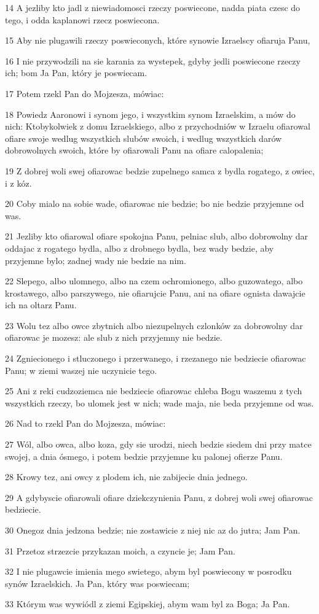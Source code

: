 \par 14 A jezliby kto jadl z niewiadomosci rzeczy poswiecone, nadda piata czesc do tego, i odda kaplanowi rzecz poswiecona.
\par 15 Aby nie plugawili rzeczy poswieconych, które synowie Izraelscy ofiaruja Panu,
\par 16 I nie przywodzili na sie karania za wystepek, gdyby jedli poswiecone rzeczy ich; bom Ja Pan, który je poswiecam.
\par 17 Potem rzekl Pan do Mojzesza, mówiac:
\par 18 Powiedz Aaronowi i synom jego, i wszystkim synom Izraelskim, a mów do nich: Ktobykolwiek z domu Izraelskiego, albo z przychodniów w Izraelu ofiarowal ofiare swoje wedlug wszystkich slubów swoich, i wedlug wszystkich darów dobrowolnych swoich, które by ofiarowali Panu na ofiare calopalenia;
\par 19 Z dobrej woli swej ofiarowac bedzie zupelnego samca z bydla rogatego, z owiec, i z kóz.
\par 20 Coby mialo na sobie wade, ofiarowac nie bedzie; bo nie bedzie przyjemne od was.
\par 21 Jezliby kto ofiarowal ofiare spokojna Panu, pelniac slub, albo dobrowolny dar oddajac z rogatego bydla, albo z drobnego bydla, bez wady bedzie, aby przyjemne bylo; zadnej wady nie bedzie na nim.
\par 22 Slepego, albo ulomnego, albo na czem ochromionego, albo guzowatego, albo krostawego, albo parszywego, nie ofiarujcie Panu, ani na ofiare ognista dawajcie ich na oltarz Panu.
\par 23 Wolu tez albo owce zbytnich albo niezupelnych czlonków za dobrowolny dar ofiarowac je mozesz: ale slub z nich przyjemny nie bedzie.
\par 24 Zgniecionego i stluczonego i przerwanego, i rzezanego nie bedziecie ofiarowac Panu; w ziemi waszej nie uczynicie tego.
\par 25 Ani z reki cudzoziemca nie bedziecie ofiarowac chleba Bogu waszemu z tych wszystkich rzeczy, bo ulomek jest w nich; wade maja, nie beda przyjemne od was.
\par 26 Nad to rzekl Pan do Mojzesza, mówiac:
\par 27 Wól, albo owca, albo koza, gdy sie urodzi, niech bedzie siedem dni przy matce swojej, a dnia ósmego, i potem bedzie przyjemne ku palonej ofierze Panu.
\par 28 Krowy tez, ani owcy z plodem ich, nie zabijecie dnia jednego.
\par 29 A gdybyscie ofiarowali ofiare dziekczynienia Panu, z dobrej woli swej ofiarowac bedziecie.
\par 30 Onegoz dnia jedzona bedzie; nie zostawicie z niej nic az do jutra; Jam Pan.
\par 31 Przetoz strzezcie przykazan moich, a czyncie je; Jam Pan.
\par 32 I nie plugawcie imienia mego swietego, abym byl poswiecony w posrodku synów Izraelskich. Ja Pan, który was poswiecam;
\par 33 Którym was wywiódl z ziemi Egipskiej, abym wam byl za Boga; Ja Pan.

